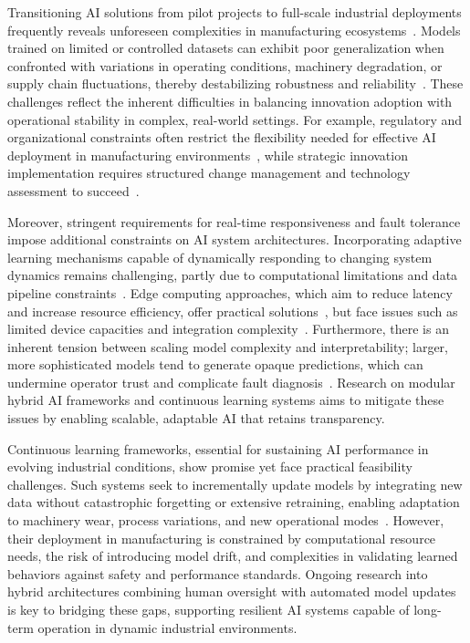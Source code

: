 \documentclass[sigconf]{acmart}
\begin{document}
Transitioning AI solutions from pilot projects to full-scale industrial deployments frequently reveals unforeseen complexities in manufacturing ecosystems~\cite{ref16,ref19}. Models trained on limited or controlled datasets can exhibit poor generalization when confronted with variations in operating conditions, machinery degradation, or supply chain fluctuations, thereby destabilizing robustness and reliability~\cite{ref6,ref20}. These challenges reflect the inherent difficulties in balancing innovation adoption with operational stability in complex, real-world settings. For example, regulatory and organizational constraints often restrict the flexibility needed for effective AI deployment in manufacturing environments~\cite{ref16}, while strategic innovation implementation requires structured change management and technology assessment to succeed~\cite{ref19}.

Moreover, stringent requirements for real-time responsiveness and fault tolerance impose additional constraints on AI system architectures. Incorporating adaptive learning mechanisms capable of dynamically responding to changing system dynamics remains challenging, partly due to computational limitations and data pipeline constraints~\cite{ref31,ref32}. Edge computing approaches, which aim to reduce latency and increase resource efficiency, offer practical solutions~\cite{ref31}, but face issues such as limited device capacities and integration complexity~\cite{ref32}. Furthermore, there is an inherent tension between scaling model complexity and interpretability; larger, more sophisticated models tend to generate opaque predictions, which can undermine operator trust and complicate fault diagnosis~\cite{ref2}. Research on modular hybrid AI frameworks and continuous learning systems aims to mitigate these issues by enabling scalable, adaptable AI that retains transparency. 

Continuous learning frameworks, essential for sustaining AI performance in evolving industrial conditions, show promise yet face practical feasibility challenges. Such systems seek to incrementally update models by integrating new data without catastrophic forgetting or extensive retraining, enabling adaptation to machinery wear, process variations, and new operational modes~\cite{ref31,ref32}. However, their deployment in manufacturing is constrained by computational resource needs, the risk of introducing model drift, and complexities in validating learned behaviors against safety and performance standards. Ongoing research into hybrid architectures combining human oversight with automated model updates is key to bridging these gaps, supporting resilient AI systems capable of long-term operation in dynamic industrial environments.
\end{document}
